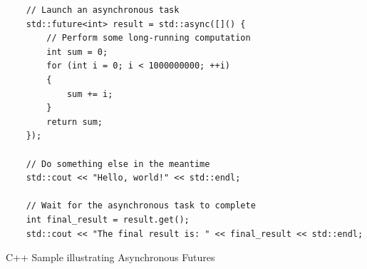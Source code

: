 \begin{listing}
    \begin{verbatim}
    // Launch an asynchronous task
    std::future<int> result = std::async([]() {
        // Perform some long-running computation
        int sum = 0;
        for (int i = 0; i < 1000000000; ++i)
        {
            sum += i;
        }
        return sum;
    });

    // Do something else in the meantime
    std::cout << "Hello, world!" << std::endl;

    // Wait for the asynchronous task to complete
    int final_result = result.get();
    std::cout << "The final result is: " << final_result << std::endl;
    \end{verbatim}
    \caption{C++ Sample illustrating Asynchronous Futures}
    \label{lst:asynccpu}
\end{listing}

